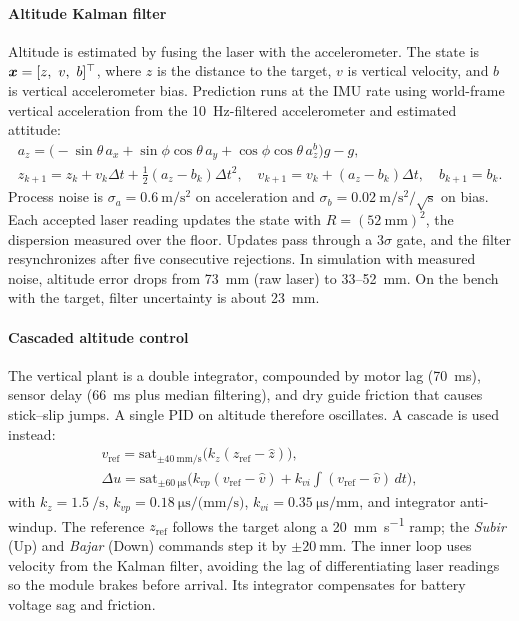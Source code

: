 \paragraph{Altitude Kalman filter} Altitude is estimated by fusing the laser with the accelerometer. The state is $\bm{x}=[z,\ v,\ b]^{\top}$, where $z$ is the distance to the target, $v$ is vertical velocity, and $b$ is vertical accelerometer bias. Prediction runs at the IMU rate using world-frame vertical acceleration from the \SI{10}{\hertz}-filtered accelerometer and estimated attitude:
\begin{equation}
  \begin{gathered}
    a_z=\big(-\sin\theta\,a_x+\sin\phi\cos\theta\,a_y+\cos\phi\cos\theta\,a_z^{b}\big)g-g,\\
    z_{k+1}=z_k+v_k\Delta t+\tfrac12(a_z-b_k)\Delta t^2,\quad
    v_{k+1}=v_k+(a_z-b_k)\Delta t,\quad b_{k+1}=b_k .
  \end{gathered}
  \label{eq:kfz}
\end{equation}
Process noise is $\sigma_a=\SI{0.6}{\metre\per\second\squared}$ on acceleration and $\sigma_b=\SI{0.02}{\metre\per\second\squared}/\sqrt{\mathrm{s}}$ on bias. Each accepted laser reading updates the state with $R=(\SI{52}{\milli\metre})^2$, the dispersion measured over the floor. Updates pass through a $3\sigma$ gate, and the filter resynchronizes after five consecutive rejections. In simulation with measured noise, altitude error drops from \SI{73}{\milli\metre} (raw laser) to 33--\SI{52}{\milli\metre}. On the bench with the target, filter uncertainty is about \SI{23}{\milli\metre}.

\paragraph{Cascaded altitude control} The vertical plant is a double integrator, compounded by motor lag (\SI{70}{\milli\second}), sensor delay (\SI{66}{\milli\second} plus median filtering), and dry guide friction that causes stick--slip jumps. A single PID on altitude therefore oscillates. A cascade is used instead:
\begin{equation}
  \begin{gathered}
    v_{\mathrm{ref}}=\mathrm{sat}_{\pm\SI{40}{\milli\metre\per\second}}\!\big(k_z(z_{\mathrm{ref}}-\hat z)\big),\\
    \Delta u=\mathrm{sat}_{\pm\SI{60}{\micro\second}}\!\Big(k_{vp}(v_{\mathrm{ref}}-\hat v)+k_{vi}\!\int(v_{\mathrm{ref}}-\hat v)\,dt\Big),
  \end{gathered}
  \label{eq:cascada}
\end{equation}
with $k_z=\SI{1.5}{\per\second}$, $k_{vp}=\SI{0.18}{\micro\second\per(\milli\metre\per\second)}$, $k_{vi}=\SI{0.35}{\micro\second\per\milli\metre}$, and integrator anti-windup. The reference $z_{\mathrm{ref}}$ follows the target along a \SI{20}{\milli\metre\per\second} ramp; the \emph{Subir} (Up) and \emph{Bajar} (Down) commands step it by $\pm\SI{20}{\milli\metre}$. The inner loop uses velocity from the Kalman filter, avoiding the lag of differentiating laser readings so the module brakes before arrival. Its integrator compensates for battery voltage sag and friction.

